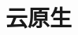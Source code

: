 \documentclass[../../dolphin-book-2023.tex]{subfiles}
\begin{document}
\section{云原生}


\end{document}
